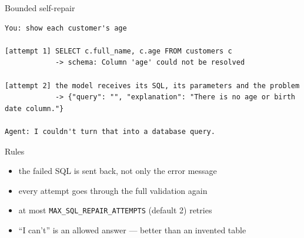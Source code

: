 \documentclass[aspectratio=169,10pt]{beamer}
\begin{document}
\begin{frame}[fragile]{Bounded self-repair}
\begin{lstlisting}
You: show each customer's age

[attempt 1] SELECT c.full_name, c.age FROM customers c
            -> schema: Column 'age' could not be resolved

[attempt 2] the model receives its SQL, its parameters and the problem
            -> {"query": "", "explanation": "There is no age or birth date column."}

Agent: I couldn't turn that into a database query.
\end{lstlisting}

  \begin{block}{Rules}
    \footnotesize
    \begin{itemize}
      \item the failed SQL is sent back, not only the error message
      \item every attempt goes through the full validation again
      \item at most \texttt{MAX\_SQL\_REPAIR\_ATTEMPTS} (default 2) retries
      \item ``I can't'' is an allowed answer --- better than an invented table
    \end{itemize}
  \end{block}
\end{frame}
\end{document}
